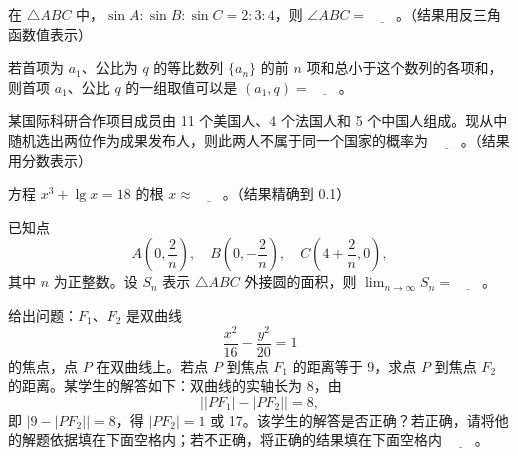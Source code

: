 \begin{question}
在 \(\triangle ABC\) 中，\(\sin A:\sin B:\sin C=2:3:4\)，则 \(\angle ABC=\underline{\qquad}\)。（结果用反三角函数值表示）

\end{question}
\begin{question}
若首项为 \(a_1\)、公比为 \(q\) 的等比数列 \(\{a_n\}\) 的前 \(n\) 项和总小于这个数列的各项和，则首项 \(a_1\)、公比 \(q\) 的一组取值可以是 \((a_1,q)=\underline{\qquad}\)。

\end{question}
\begin{question}
某国际科研合作项目成员由 11 个美国人、4 个法国人和 5 个中国人组成。现从中随机选出两位作为成果发布人，则此两人不属于同一个国家的概率为 \(\underline{\qquad}\)。（结果用分数表示）

\end{question}
\begin{question}
方程 \(x^3+\lg x=18\) 的根 \(x\approx\underline{\qquad}\)。（结果精确到 0.1）

\end{question}
\begin{question}
已知点
\nopagebreak[4]
\[
    A\left(0,\frac{2}{n}\right),\quad B\left(0,-\frac{2}{n}\right),\quad C\left(4+\frac{2}{n},0\right),
\]
    其中 \(n\) 为正整数。设 \(S_n\) 表示 \(\triangle ABC\) 外接圆的面积，则 \(\lim_{n\to\infty}S_n=\underline{\qquad}\)。

\end{question}
\begin{question}
给出问题：\(F_1\text{、}F_2\) 是双曲线
\nopagebreak[4]
\[
    \frac{x^2}{16}-\frac{y^2}{20}=1
\]
    的焦点，点 \(P\) 在双曲线上。若点 \(P\) 到焦点 \(F_1\) 的距离等于 9，求点 \(P\) 到焦点 \(F_2\) 的距离。某学生的解答如下：双曲线的实轴长为 8，由
\nopagebreak[4]
\[
    \bigl||PF_1|-|PF_2|\bigr|=8,
\]
    即 \(|9-|PF_2||=8\)，得 \(|PF_2|=1\) 或 17。该学生的解答是否正确？若正确，请将他的解题依据填在下面空格内；若不正确，将正确的结果填在下面空格内 \(\underline{\qquad}\)。

\end{question}

